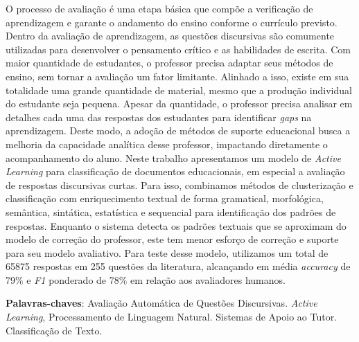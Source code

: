 O processo de avaliação é uma etapa básica que compõe a verificação de aprendizagem e garante o andamento do ensino conforme o currículo previsto. Dentro da avaliação de aprendizagem, as questões discursivas são comumente utilizadas para desenvolver o pensamento crítico e as habilidades de escrita. Com maior quantidade de estudantes, o professor precisa adaptar seus métodos de ensino, sem tornar a avaliação um fator limitante. Alinhado a isso, existe em sua totalidade uma grande quantidade de material, mesmo que a produção individual do estudante seja pequena. Apesar da quantidade, o professor precisa analisar em detalhes cada uma das respostas dos estudantes para identificar \textit{gaps} na aprendizagem. Deste modo, a adoção de métodos de suporte educacional busca a melhoria da capacidade analítica desse professor, impactando diretamente o acompanhamento do aluno. Neste trabalho apresentamos um modelo de \textit{Active Learning} para classificação de documentos educacionais, em especial a avaliação de respostas discursivas curtas. Para isso, combinamos métodos de clusterização e classificação com enriquecimento textual de forma gramatical, morfológica, semântica, sintática, estatística e sequencial para identificação dos padrões de respostas. Enquanto o sistema detecta os padrões textuais que se aproximam do modelo de correção do professor, este tem menor esforço de correção e suporte para seu modelo avaliativo. Para teste desse modelo, utilizamos um total de 65875 respostas em 255 questões da literatura, alcançando em média \textit{accuracy} de 79\% e \textit{F1} ponderado de 78\% em relação aos avaliadores humanos.


\textbf{Palavras-chaves}: Avaliação Automática de Questões Discursivas. \textit{Active Learning}, Processamento de Linguagem Natural. Sistemas de Apoio ao Tutor. Classificação de Texto.